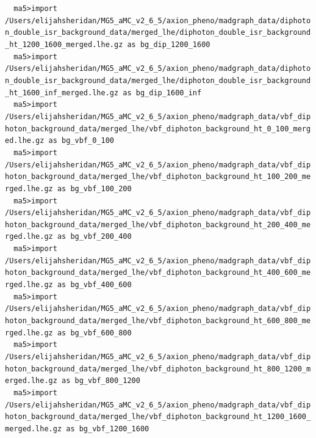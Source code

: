 \documentclass[a4paper, 10pt]{article}
\begin{document}
\texttt{ }\texttt{ }\texttt{ma5>import /\-Users/\-elijahsheridan/\-MG5\_aMC\_v2\_6\_5/\-axion\_pheno/\-madgraph\_data/\-diphoton\_double\_isr\_background\_data/\-merged\_lhe/\-diphoton\_double\_isr\_background\_ht\_1200\_1600\_merged.lhe.gz as bg\_dip\_1200\_1600\\
}
\texttt{ }\texttt{ }\texttt{ma5>import /\-Users/\-elijahsheridan/\-MG5\_aMC\_v2\_6\_5/\-axion\_pheno/\-madgraph\_data/\-diphoton\_double\_isr\_background\_data/\-merged\_lhe/\-diphoton\_double\_isr\_background\_ht\_1600\_inf\_merged.lhe.gz as bg\_dip\_1600\_inf\\
}
\texttt{ }\texttt{ }\texttt{ma5>import /\-Users/\-elijahsheridan/\-MG5\_aMC\_v2\_6\_5/\-axion\_pheno/\-madgraph\_data/\-vbf\_diphoton\_background\_data/\-merged\_lhe/\-vbf\_diphoton\_background\_ht\_0\_100\_merged.lhe.gz as bg\_vbf\_0\_100\\
}
\texttt{ }\texttt{ }\texttt{ma5>import /\-Users/\-elijahsheridan/\-MG5\_aMC\_v2\_6\_5/\-axion\_pheno/\-madgraph\_data/\-vbf\_diphoton\_background\_data/\-merged\_lhe/\-vbf\_diphoton\_background\_ht\_100\_200\_merged.lhe.gz as bg\_vbf\_100\_200\\
}
\texttt{ }\texttt{ }\texttt{ma5>import /\-Users/\-elijahsheridan/\-MG5\_aMC\_v2\_6\_5/\-axion\_pheno/\-madgraph\_data/\-vbf\_diphoton\_background\_data/\-merged\_lhe/\-vbf\_diphoton\_background\_ht\_200\_400\_merged.lhe.gz as bg\_vbf\_200\_400\\
}
\texttt{ }\texttt{ }\texttt{ma5>import /\-Users/\-elijahsheridan/\-MG5\_aMC\_v2\_6\_5/\-axion\_pheno/\-madgraph\_data/\-vbf\_diphoton\_background\_data/\-merged\_lhe/\-vbf\_diphoton\_background\_ht\_400\_600\_merged.lhe.gz as bg\_vbf\_400\_600\\
}
\texttt{ }\texttt{ }\texttt{ma5>import /\-Users/\-elijahsheridan/\-MG5\_aMC\_v2\_6\_5/\-axion\_pheno/\-madgraph\_data/\-vbf\_diphoton\_background\_data/\-merged\_lhe/\-vbf\_diphoton\_background\_ht\_600\_800\_merged.lhe.gz as bg\_vbf\_600\_800\\
}
\texttt{ }\texttt{ }\texttt{ma5>import /\-Users/\-elijahsheridan/\-MG5\_aMC\_v2\_6\_5/\-axion\_pheno/\-madgraph\_data/\-vbf\_diphoton\_background\_data/\-merged\_lhe/\-vbf\_diphoton\_background\_ht\_800\_1200\_merged.lhe.gz as bg\_vbf\_800\_1200\\
}
\texttt{ }\texttt{ }\texttt{ma5>import /\-Users/\-elijahsheridan/\-MG5\_aMC\_v2\_6\_5/\-axion\_pheno/\-madgraph\_data/\-vbf\_diphoton\_background\_data/\-merged\_lhe/\-vbf\_diphoton\_background\_ht\_1200\_1600\_merged.lhe.gz as bg\_vbf\_1200\_1600\\
}
\end{document}
